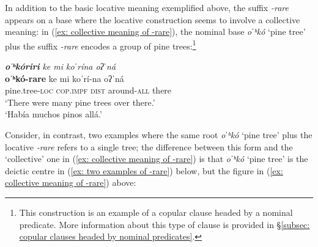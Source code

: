 In addition to the basic locative meaning exemplified above, the suffix \textit{-rare} appears on a base where the locative construction seems to involve a collective meaning: in (\ref{ex: collective meaning of -rare}), the nominal base \textit{oˈʰkó} ‘pine tree’ plus the suffix \textit{-rare} encodes a group of pine trees:\footnote{This construction is an example of a copular clause headed by a nominal predicate. More information about this type of  clause is provided in §\ref{subsec: copular clauses headed by nominal predicates}.}

\ea\label{ex: collective meaning of -rare}

    {\textbf{\textit{oˈʰkóriri}} \textit{ke    mi  koˈrína  oʔˈná}}\\
    \gll    \textbf{oˈʰkó-rare}    ke    mi  koˈrí-na  oʔˈná\\
            pine.tree-\textsc{loc} \textsc{cop.impf} \textsc{dist} around-\textsc{all}  there  \\
    \glt    ‘There were many pine trees over there.’\\
    \glt    ‘Había muchos pinos allá.’  \\

\z

Consider, in contrast, two examples where the same root \textit{oˈʰkó} ‘pine tree’ plus the locative \textit{-rare} refers to a single tree; the difference between this form and the ‘collective’ one in (\ref{ex: collective meaning of -rare}) is that \textit{oˈʰkó} ‘pine tree’ is the deictic centre in (\ref{ex:  two examples of -rare}) below, but the figure in (\ref{ex: collective meaning of -rare}) above:

